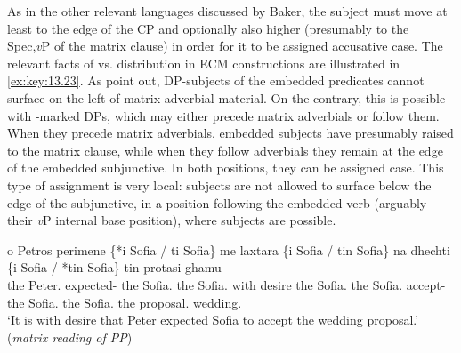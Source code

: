 \documentclass[output=paper]{langsci/langscibook}
\begin{document}
\ea%
    \label{ex:key:13.22}
    \z
\z

As in the other relevant languages discussed by Baker, the subject must move at
least to the edge of the CP and optionally also higher (presumably to the
Spec,\emph{v}P of the matrix clause) in order for it to be assigned accusative
case.  The relevant facts of \Acc{} vs. \Nom{} distribution in  ECM
constructions are illustrated in \eqref{ex:key:13.23}. As \citet{KotzPapa2007} point
out, \Nom{} DP-subjects of the embedded predicates cannot surface on the left of
matrix adverbial material. On the contrary, this is possible with \Acc{}-marked
DPs, which may either precede matrix adverbials or follow them. When they
precede matrix adverbials, embedded \Acc{} subjects have presumably raised to the
matrix clause, while when they follow adverbials they remain at the edge of the
embedded subjunctive. In both positions, they can be assigned \Acc{} case. This
type of \Acc{} assignment is very local: \Acc{} subjects are not allowed to
surface below the edge of the subjunctive, in a position following the embedded
verb (arguably their \emph{v}P internal base position), where \Nom{} subjects are
possible.

\ea%
\label{ex:key:13.23}
    \sn
    \gll o Petros perimene \{*i Sofia / ti Sofia\} me laxtara \{i Sofia / tin Sofia\} na dhechti \{i Sofia / *tin Sofia\} tin protasi ghamu \\
    the Peter.\Nom{} expected-\Tsg{} \hphantom{\{*}the Sofia.\textbf{\Nom{}} {}
        the Sofia.\textbf{\Acc{}} with desire \hphantom{\{}the
            Sofia.\textbf{\Nom} {} the Sofia.\textbf{\Acc} \Sbjv{} accept-\Tsg{}
            \hphantom{\{}the Sofia.\textbf{\Nom} {} \hphantom{*}the
                Sofia.\textbf{\Acc} the proposal.\Acc{} wedding.\Gen{}\\
    \glt    \enquote*{It is with desire that Peter expected Sofia to accept the wedding proposal.} (\emph{matrix reading of PP})
\z
\end{document}
